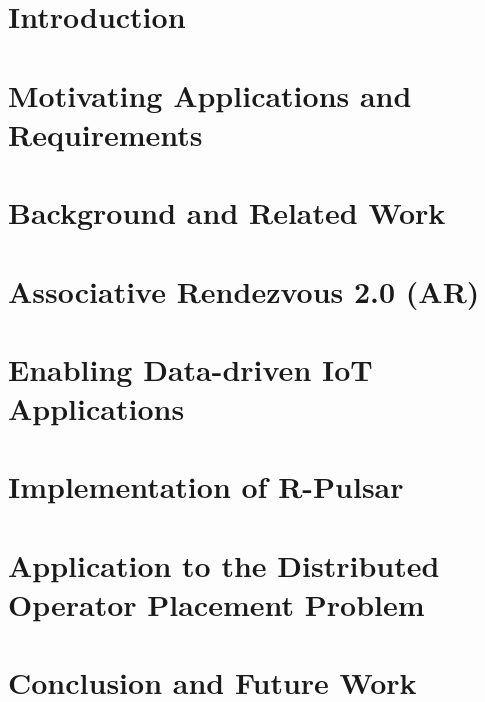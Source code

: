 \documentclass{ruthesis}
\begin{document}
\beforepreface
{}
\dedication{The body of the dedication}
\afterpreface

\listoftables
\listoffigures

\chapter{Introduction}

\chapter{Motivating Applications and Requirements} \label{chap:applications}

\chapter{Background and Related Work}

\chapter{Associative Rendezvous 2.0 (AR)} \label{chap:AR}

\chapter{Enabling Data-driven IoT Applications}

\chapter{Implementation of R-Pulsar}

\chapter{Application to the Distributed Operator Placement Problem}

\chapter{Conclusion and Future Work}





\end{document}
